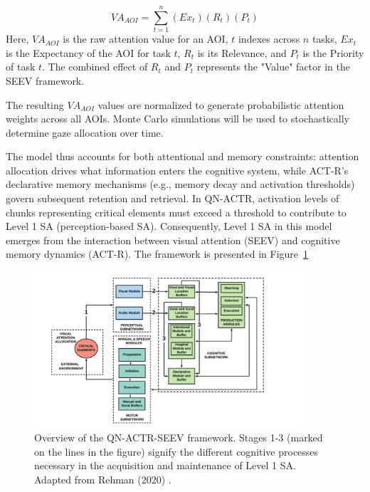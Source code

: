 \documentclass[12pt,a4paper]{article} %
\begin{document}
	\begin{equation}
		VA_{AOI} = \sum_{t=1}^{n} (Ex_t) (R_t) (P_t)
		\label{eq:VA_AOI}
		\end{equation}
	Here, $VA_{AOI}$ is the raw attention value for an AOI, $t$ indexes across $n$ tasks, $Ex_t$ is the Expectancy of the AOI for task $t$, $R_t$ is its Relevance, and $P_t$ is the Priority of task $t$. The combined effect of $R_t$ and $P_t$ represents the "Value" factor in the SEEV framework.
	
	The resulting $VA_{AOI}$ values are normalized to generate probabilistic attention weights across all AOIs. Monte Carlo simulations will be used to stochastically determine gaze allocation over time.
	
	The model thus accounts for both attentional and memory constraints: attention allocation drives what information enters the cognitive system, while ACT-R's declarative memory mechanisms (e.g., memory decay and activation thresholds) govern subsequent retention and retrieval. In QN-ACTR, activation levels of chunks representing critical elements must exceed a threshold to contribute to Level 1 SA (perception-based SA). Consequently, Level 1 SA in this model emerges from the interaction between visual attention (SEEV) and cognitive memory dynamics (ACT-R). The framework is presented in Figure~\ref{fig:qn-actr-seev}

	\begin{figure}[h!]
    \centering
    \includegraphics[width=0.9\textwidth]{./images/qn-actr-sa-synoptic.png}
    \caption{Overview of the QN-ACTR-SEEV framework. Stages 1-3 (marked on the lines in the figure) signify the different cognitive processes necessary in the acquisition and maintenance of Level 1 SA. Adapted from Rehman (2020) \parencite{rehman_phd_thesis}.}
    \label{fig:qn-actr-seev}
	\end{figure}
\end{document}
